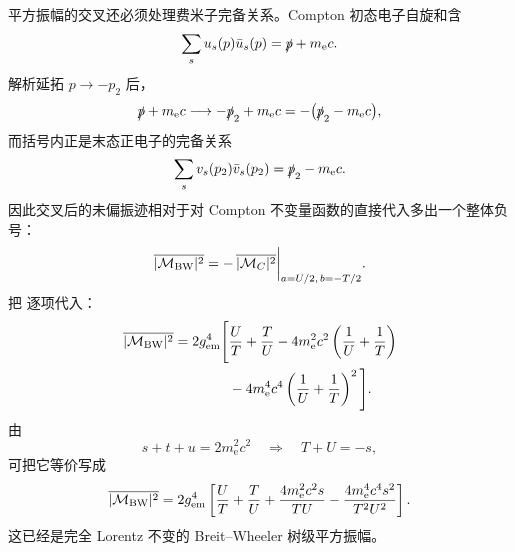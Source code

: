 \begin{derivation}[双光子产生电子对的角分布]
平方振幅的交叉还必须处理费米子完备关系。Compton 初态电子自旋和含
\begin{equation*}
 \sum_su_s(p)\bar u_s(p)=\slashed p+m_{\mathrm e} c.
\end{equation*}
解析延拓 $p\to-p_2$ 后，
\begin{equation*}
 \slashed p+m_{\mathrm e} c
 \longrightarrow
 -\slashed p_2+m_{\mathrm e} c
 =-\bigl(\slashed p_2-m_{\mathrm e} c\bigr),
\end{equation*}
而括号内正是末态正电子的完备关系
\begin{equation*}
 \sum_sv_s(p_2)\bar v_s(p_2)=\slashed p_2-m_{\mathrm e} c.
\end{equation*}
因此交叉后的未偏振迹相对于对 Compton 不变量函数的直接代入多出一个整体负号：
\begin{equation*}
 \overline{|\mathcal M_{\rm BW}|^2}
 =-\,\overline{|\mathcal M_C|^2}
 \bigg|_{a=U/2,\,b=-T/2}.
\end{equation*}
把 逐项代入：
\begin{align*}
 \overline{|\mathcal M_{\rm BW}|^2}
 =2g_{\rm em}^4\Bigg[
 &\frac UT+\frac TU
 -4m_{\mathrm e}^2c^2\left(\frac1U+\frac1T\right)\\
 &-4m_{\mathrm e}^4c^4\left(\frac1U+\frac1T\right)^2
 \Bigg].
\end{align*}
由
\begin{equation*}
 s+t+u=2m_{\mathrm e}^2c^2
 \quad\Longrightarrow\quad
 T+U=-s,
\end{equation*}
可把它等价写成
\begin{equation*}
 \overline{|\mathcal M_{\rm BW}|^2}
 =2g_{\rm em}^4\left[
 \frac UT+\frac TU
 +\frac{4m_{\mathrm e}^2c^2s}{TU}
 -\frac{4m_{\mathrm e}^4c^4s^2}{T^2U^2}
 \right].
\end{equation*}
这已经是完全 Lorentz 不变的 Breit--Wheeler 树级平方振幅。


\end{derivation}
